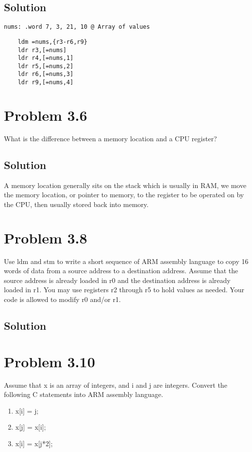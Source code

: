\documentclass[letterpaper,11pt]{texMemo} %
\begin{document}
\subsection*{Solution}
\begin{lstlisting}
nums: .word 7, 3, 21, 10 @ Array of values
\end{lstlisting}

\begin{lstlisting}
    ldm =nums,{r3-r6,r9}
    ldr r3,[=nums]
    ldr r4,[=nums,1]
    ldr r5,[=nums,2]
    ldr r6,[=nums,3]
    ldr r9,[=nums,4]
\end{lstlisting}

\section*{Problem 3.6}
What is the difference between a memory location and a CPU register?
\subsection*{Solution}
A memory location generally sits on the stack which is usually in RAM, we move the memory location, or pointer to memory, to the register
to be operated on by the CPU, then usually stored back into memory.

\newpage
\section*{Problem 3.8}
Use ldm and stm to write a short sequence of ARM assembly language to copy 16 words of data from a source address to a
destination address. Assume that the source address is already loaded in r0 and the destination address is already loaded in r1.
You may use registers r2 through r5 to hold values as needed. Your code is allowed to modify r0 and/or r1.
\subsection*{Solution}



\section*{Problem 3.10}
Assume that x is an array of integers, and i and j are integers. Convert the following C statements into ARM assembly language.
\begin{enumerate}[label=\Alph*]
    \item x[i] = j;
    \item x[j] = x[i];
    \item x[i] = x[j*2];
\end{enumerate}
\end{document}
